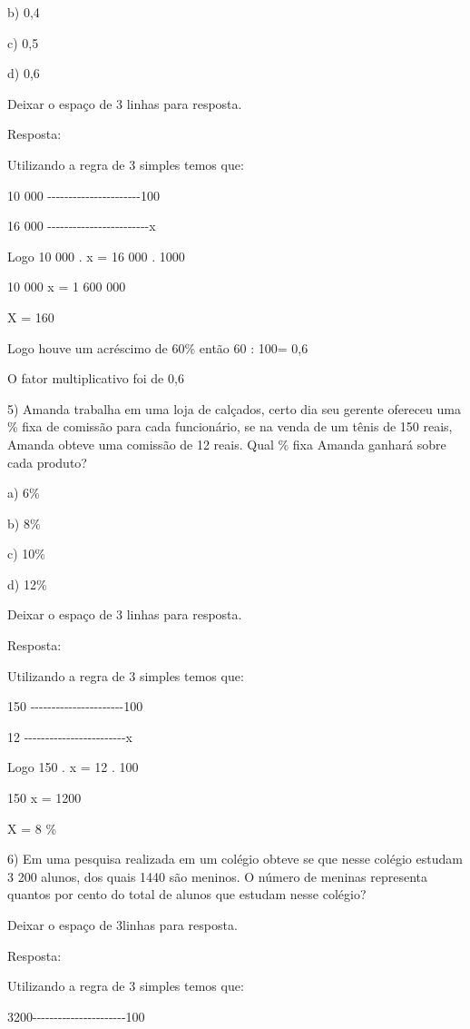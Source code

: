 {b) 0,4

c) 0,5

d) 0,6

Deixar o espaço de 3 linhas para resposta.

Resposta:

Utilizando a regra de 3 simples temos que:

10 000
-\/-\/-\/-\/-\/-\/-\/-\/-\/-\/-\/-\/-\/-\/-\/-\/-\/-\/-\/-\/-\/-100

16 000
-\/-\/-\/-\/-\/-\/-\/-\/-\/-\/-\/-\/-\/-\/-\/-\/-\/-\/-\/-\/-\/-\/-\/-x

Logo 10 000 . x = 16 000 . 1000

10 000 x = 1 600 000

X = 160

Logo houve um acréscimo de 60\% então 60 : 100= 0,6

O fator multiplicativo foi de 0,6

5) Amanda trabalha em uma loja de calçados, certo dia seu gerente
ofereceu uma \% fixa de comissão para cada funcionário, se na venda de
um tênis de 150 reais, Amanda obteve uma comissão de 12 reais. Qual \%
fixa Amanda ganhará sobre cada produto?

a) 6\%

b) 8\%

c) 10\%

d) 12\%

Deixar o espaço de 3 linhas para resposta.

Resposta:

Utilizando a regra de 3 simples temos que:

150 -\/-\/-\/-\/-\/-\/-\/-\/-\/-\/-\/-\/-\/-\/-\/-\/-\/-\/-\/-\/-\/-100

12
-\/-\/-\/-\/-\/-\/-\/-\/-\/-\/-\/-\/-\/-\/-\/-\/-\/-\/-\/-\/-\/-\/-\/-x

Logo 150 . x = 12 . 100

150 x = 1200

X = 8 \%

6) Em uma pesquisa realizada em um colégio obteve se que nesse colégio
estudam 3 200 alunos, dos quais 1440 são meninos. O número de meninas
representa quantos por cento do total de alunos que estudam nesse
colégio?

Deixar o espaço de 3linhas para resposta.

Resposta:

Utilizando a regra de 3 simples temos que:

3200-\/-\/-\/-\/-\/-\/-\/-\/-\/-\/-\/-\/-\/-\/-\/-\/-\/-\/-\/-\/-\/-100

}
